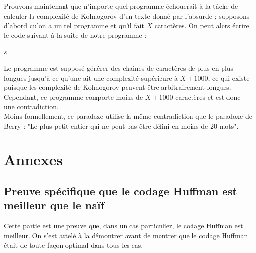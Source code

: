 \documentclass[a4paper, 12pt]{article}
\begin{document}
Prouvons maintenant que n'importe quel programme échouerait à la tâche de calculer la complexité de Kolmogorov d'un texte donné par l'absurde ; supposons d'abord qu'on a un tel programme et qu'il fait $X$ caractères. On peut alors écrire le code suivant à la suite de notre programme : \\

\begin{algorithm}
\begin{algorithmic}[1]
\State \Return $s$
\EndIf
\EndFor
\EndFor
\EndFunction
\end{algorithmic}
\end{algorithm}
\newpage
Le programme est supposé générer des chaines de caractères de plus en plus longues jusqu'à ce qu'une ait une complexité supérieure à $X+1000$, ce qui existe puisque les complexité de Kolmogorov peuvent être arbitrairement longues. Cependant, ce programme comporte moins de $X+1000$ caractères et est donc une contradiction. \\
Moins formellement, ce paradoxe utilise la même contradiction que le paradoxe de Berry : "Le plus petit entier qui ne peut pas être défini en moins de 20 mots".



\newpage

\section{Annexes}
\subsection{Preuve spécifique que le codage Huffman est meilleur que le naïf}
Cette partie est une preuve que, dans un cas particulier, le codage Huffman est meilleur. On s'est attelé à la démontrer avant de montrer que le codage Huffman était de toute façon optimal dans tous les cas. \\
\end{document}
